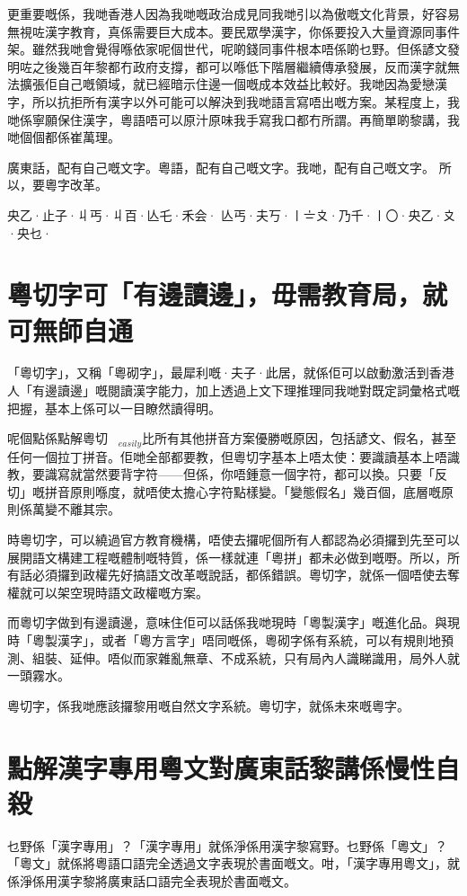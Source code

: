 \documentclass[a5paper, 10pt, openany]{book} %
\begin{document}
更重要嘅係，我哋香港人因為我哋嘅政治成見同我哋引以為傲嘅文化背景，好容易無視咗漢字教育，真係需要巨大成本。要民眾學漢字，你係要投入大量資源同事件架。雖然我哋會覺得喺依家呢個世代，呢啲錢同事件根本唔係啲乜野。但係諺文發明咗之後幾百年黎都冇政府支撐，都可以喺低下階層繼續傳承發展，反而漢字就無法擴張佢自己嘅領域，就已經暗示住邊一個嘅成本效益比較好。我哋因為愛戀漢字，所以抗拒所有漢字以外可能可以解決到我哋語言寫唔出嘅方案。某程度上，我哋係寧願保住漢字，粵語唔可以原汁原味我手寫我口都冇所謂。再簡單啲黎講，我哋個個都係崔萬理。

廣東話，配有自己嘅文字。粵語，配有自己嘅文字。我哋，配有自己嘅文字。
所以，要粵字改革。

央乙·止子·丩丐·丩百·亾乇·禾会·
亾丐·夫丂·〡〧〩·乃千·〡〇·央乙·〩·央乜·




\chapter{粵切字可「有邊讀邊」，毋需教育局，就可無師自通}

「粵切字」，又稱「粵砌字」，最犀利嘅·夫子·此居，就係佢可以啟動激活到香港人「有邊讀邊」嘅閱讀漢字能力，加上透過上文下理推理同我哋對既定詞彙格式嘅把握，基本上係可以一目瞭然讀得明。

呢個點係點解粵切$_{easily}$比所有其他拼音方案優勝嘅原因，包括諺文、假名，甚至任何一個拉丁拼音。佢哋全部都要教，但粵切字基本上唔太使：要識讀基本上唔識教，要識寫就當然要背字符——但係，你唔鍾意一個字符，都可以換。只要「反切」嘅拼音原則喺度，就唔使太擔心字符點樣變。「變態假名」幾百個，底層嘅原則係萬變不離其宗。

時粵切字，可以繞過官方教育機構，唔使去攞呢個所有人都認為必須攞到先至可以展開語文構建工程嘅體制嘅特質，係一樣就連「粵拼」都未必做到嘅嘢。所以，所有話必須攞到政權先好搞語文改革嘅說話，都係錯誤。粵切字，就係一個唔使去奪權就可以架空現時語文政權嘅方案。

而粵切字做到有邊讀邊，意味住佢可以話係我哋現時「粵製漢字」嘅進化品。與現時「粵製漢字」，或者「粵方言字」唔同嘅係，粵砌字係有系統，可以有規則地預測、組裝、延伸。唔似而家雜亂無章、不成系統，只有局內人識睇識用，局外人就一頭霧水。

粵切字，係我哋應該攞黎用嘅自然文字系統。粵切字，就係未來嘅粵字。


\chapter{點解漢字專用粵文對廣東話黎講係慢性自殺}
乜野係「漢字專用」？「漢字專用」就係淨係用漢字黎寫野。乜野係「粵文」？「粵文」就係將粵語口語完全透過文字表現於書面嘅文。咁，「漢字專用粵文」，就係淨係用漢字黎將廣東話口語完全表現於書面嘅文。
\end{document}
